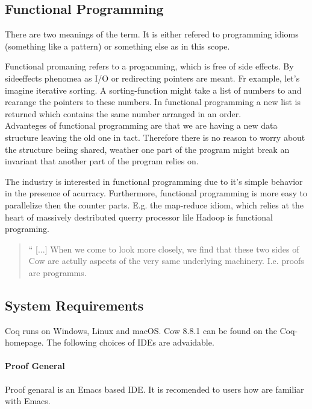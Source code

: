 \subsection{Functional Programming}
There are two meanings of the term. It is either refered to programming idioms (something like a pattern)
or something else as in this scope.\par
Functional promaning refers to a progamming, which is free of side effects.
By sideeffects phenomea as I/O or redirecting pointers are meant. Fr example, let's imagine iterative sorting. 
A sorting-function might take a list of numbers to and rearange the pointers to these numbers.
In functional programming a new list is returned which contains the same number arranged in an order.\\ 
Advanteges of functional programming are  that we are having a new data structure leaving the old one in tact. 
Therefore there is no reason to worry about the structure beiing shared, weather one part of the program might break an invariant that another part of the program relies on.\par
The industry is interested in functional programming due to it's simple behavior in the presence of acurracy.
Furthermore, functional programming is more easy to parallelize then the counter parts.
E.g. the map-reduce idiom, which relies at the heart of massively destributed querry processor lile  \gls{Hadoop} is functional programing. 

\begin{quote}
`` [...] When we come to look more closely, we find that these two sides of Cow are actully aspects of the very same underlying machinery. I.e. proofs are programms. 
\end{quote}
 


\subsection{System Requirements}

Coq runs on Windows, Linux and macOS.
Cow 8.8.1 can be found on the Coq-homepage.
The following choices of IDEs are advaidable. 

\paragraph{Proof General}
Proof genaral is an \gls{Emacs} based IDE. It is recomended to users how are familiar with \gls{Emacs}.

